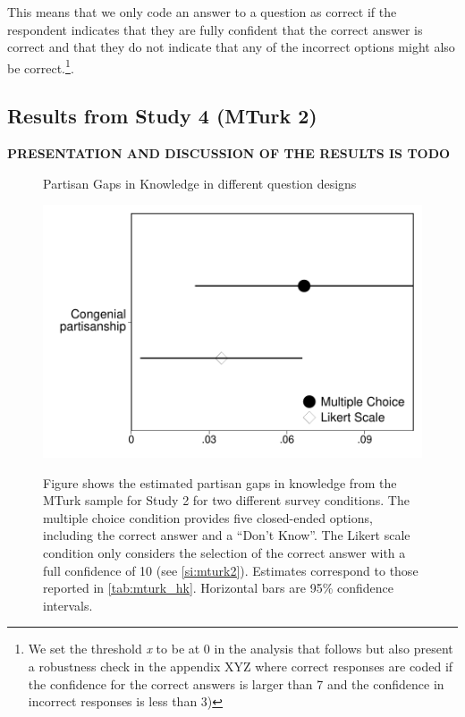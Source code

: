 \documentclass[12pt, letterpaper]{article}
\begin{document}
This means that we only code an answer to a question as correct if the respondent indicates that they are fully confident that the correct answer is correct and that they do not indicate that any of the incorrect options might also be correct.\footnote{We set the threshold \emph{x} to be at 0 in the analysis that follows but also present a robustness check in the appendix XYZ where correct responses are coded if the confidence for the correct answers is larger than 7 and the confidence in incorrect responses is less than 3)}.


\subsection*{Results from Study 4 (MTurk 2)}

\textbf{PRESENTATION AND DISCUSSION OF THE RESULTS IS TODO}







\begin{center}
	\begin{figure}[h]
		\centering
		\caption{Partisan Gaps in Knowledge in different question designs}
		\includegraphics[width=.55\textwidth]{../figs/mturk-hk-MC-LIKERT.pdf}
		\label{fig:mturk_hk}
		\caption*{\scriptsize
			Figure shows the estimated partisan gaps in knowledge from the MTurk sample for Study 2 for two different survey conditions.
			The multiple choice condition provides five closed-ended options, including the correct answer and a ``Don't Know''.
			The Likert scale condition only considers the selection of the correct answer with a full confidence of 10 (see \cref{si:mturk2}).
			Estimates correspond to those reported in \cref{tab:mturk_hk}.
			Horizontal bars are 95\% confidence intervals.
		}
	\end{figure}
\end{center}
\end{document}
